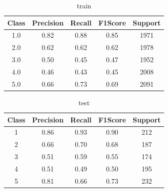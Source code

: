 \begin{enumerate}[label=(\alph*)]
\begin{enumerate}[label=\roman*.]
        \begin{table}[!htb]
            \centering
            \begin{tabular}{ccccc}
            \hline
            Class & Precision & Recall & F1Score & Support \\ \hline
            1.0   & 0.82      & 0.88   & 0.85    & 1971    \\
            2.0   & 0.62      & 0.62   & 0.62    & 1978    \\
            3.0   & 0.50      & 0.45   & 0.47    & 1952    \\
            4.0   & 0.46      & 0.43   & 0.45    & 2008    \\
            5.0   & 0.66      & 0.73   & 0.69    & 2091    \\ \hline
            \end{tabular}
            \caption{train}
            \label{part f train depth 4}
        \end{table}
        \begin{table}[!htb]
            \centering
            \begin{tabular}{ccccc}
            \hline
            Class & Precision & Recall & F1Score & Support \\ \hline
            1     & 0.86      & 0.93   & 0.90    & 212     \\
            2     & 0.66      & 0.70   & 0.68    & 187     \\
            3     & 0.51      & 0.59   & 0.55    & 174     \\
            4     & 0.51      & 0.49   & 0.50    & 195     \\
            5     & 0.81      & 0.66   & 0.73    & 232     \\ \hline
            \end{tabular}
            \caption{test}
            \label{part f test depth 4}
        \end{table}
        \newpage
        


\end{enumerate}
\end{enumerate}
